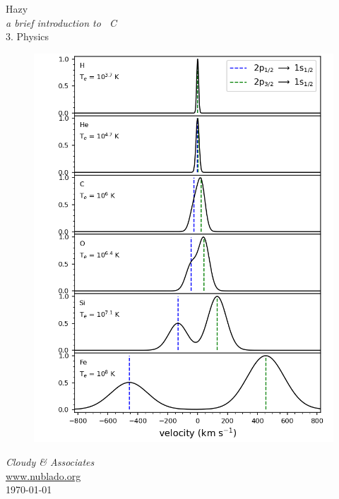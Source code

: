 \documentclass[12pt]{book}
\begin{document}
\frontmatter

\begin{titlepage}
\begin{center}

\Huge
Hazy\\
\Large
\emph{a brief introduction to \Cloudy\ C\VERSION}\\
\LARGE
3. Physics

\begin{figure}
\begin{center}
\includegraphics[clip=on,width=\columnwidth,height=0.6\textheight,keepaspectratio]{LineOverlap.png}

\end{center}
\end{figure}

\vspace{15 mm }
\LARGE
\emph{Cloudy \& Associates} \\
\Large
\href{http://www.nublado.org}{www.nublado.org} \\
\normalsize
\today
\end{center}
\end{titlepage}
\end{document}
